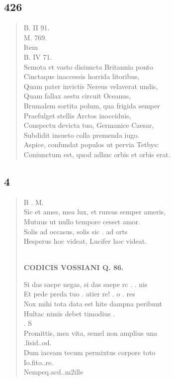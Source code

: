 \documentclass[11pt, a4paper]{report}
\begin{document}
            \subsection*{426}
      \begin{verse}
      B. II 91. \\ M. 769. \\  \lbrack Item \rbrack  \\ B. IV 71. \\ Semota et vasto disiuncta Britannia ponto \\ Cinctaque inaccessis horrida litoribus, \\ Quam pater invictis Nereus velaverat undis, \\ Quam fallax aestu circuit Oceanus, \\ Brumalem sortita polum, qua frigida semper \\ Praefulget stellis Arctos inocciduis, \\ Conspectu devicta tuo, Germanice Caesar, \\ Subdidit insueto colla premenda iugo. \\ Aspice, confundat populos ut pervia Tetbys: \\ Coniunctum est, quod adhuc orbis et orbis erat. \\ 
      \end{verse}
  
            \subsection*{4}
      \begin{verse}
      B . M. \\ Sic et ames, mea lux, et rursus semper ameris, \\ Mutuus ut nullo tempore cesset amor. \\ Solis ad occasus, solis sic . ad orts \\ Hesperus hoc videat, Lucifer hoc videat. \\ 
        ﻿\pagebreak 
    \begin{center} \textbf{CODICIS VOSSIANI Q. 86.} \end{center} \marginpar{[327]} Si das saepe negas, si das saepe rc . . nis \\ Et pede preda tuo . atier re! . o . res \\ Nox mihi tota data est hite dampna peribunt \\ Hultac nimis debet timodius . \\ . S \\ Promittis, mea vita, semel non amplius una \\ .lisid..od. \\ Dum iaceam tecum permixtus corpore toto \\ Io.fito..re. \\ Nempeq.acd..m2ille \\ 
      \end{verse}
  
\end{document}
